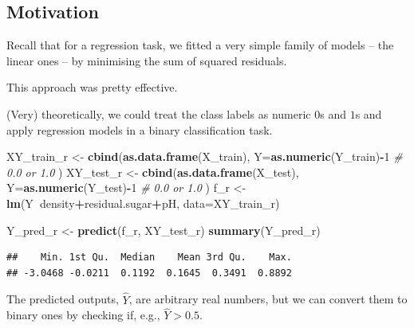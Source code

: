 \documentclass[10pt,b5paper,krantz1]{krantz}
\newenvironment{Shaded}{\begin{snugshade}}{\end{snugshade}}
\newcommand{\CommentTok}[1]{\textcolor[rgb]{0.37,0.37,0.37}{\textit{#1}}}
\newcommand{\DataTypeTok}[1]{\textcolor[rgb]{0.27,0.27,0.27}{#1}}
\newcommand{\DecValTok}[1]{\textcolor[rgb]{0.06,0.06,0.06}{#1}}
\newcommand{\FloatTok}[1]{\textcolor[rgb]{0.06,0.06,0.06}{#1}}
\newcommand{\KeywordTok}[1]{\textcolor[rgb]{0.27,0.27,0.27}{\textbf{#1}}}
\newcommand{\NormalTok}[1]{#1}
\newcommand{\OperatorTok}[1]{\textcolor[rgb]{0.43,0.43,0.43}{\textbf{#1}}}
\newcommand{\StringTok}[1]{\textcolor[rgb]{0.5,0.5,0.5}{#1}}
\begin{document}
\hypertarget{motivation}{%
\subsection{Motivation}\label{motivation}}

Recall that for a regression task, we fitted a very simple family of models
-- the linear ones -- by minimising the sum of squared residuals.

This approach was pretty effective.

(Very) theoretically, we could treat the class labels as numeric \(0\)s and \(1\)s
and apply regression models in a binary classification task.

\begin{Shaded}
\begin{Highlighting}[]
\NormalTok{XY_train_r <-}\StringTok{ }\KeywordTok{cbind}\NormalTok{(}\KeywordTok{as.data.frame}\NormalTok{(X_train),}
    \DataTypeTok{Y=}\KeywordTok{as.numeric}\NormalTok{(Y_train)}\OperatorTok{-}\DecValTok{1} \CommentTok{# 0.0 or 1.0}
\NormalTok{)}
\NormalTok{XY_test_r <-}\StringTok{ }\KeywordTok{cbind}\NormalTok{(}\KeywordTok{as.data.frame}\NormalTok{(X_test),}
    \DataTypeTok{Y=}\KeywordTok{as.numeric}\NormalTok{(Y_test)}\OperatorTok{-}\DecValTok{1} \CommentTok{# 0.0 or 1.0}
\NormalTok{)}
\NormalTok{f_r <-}\StringTok{ }\KeywordTok{lm}\NormalTok{(Y}\OperatorTok{~}\NormalTok{density}\OperatorTok{+}\NormalTok{residual.sugar}\OperatorTok{+}\NormalTok{pH, }\DataTypeTok{data=}\NormalTok{XY_train_r)}
\end{Highlighting}
\end{Shaded}

\begin{Shaded}
\begin{Highlighting}[]
\NormalTok{Y_pred_r <-}\StringTok{ }\KeywordTok{predict}\NormalTok{(f_r, XY_test_r)}
\KeywordTok{summary}\NormalTok{(Y_pred_r)}
\end{Highlighting}
\end{Shaded}

\begin{verbatim}
##    Min. 1st Qu.  Median    Mean 3rd Qu.    Max. 
## -3.0468 -0.0211  0.1192  0.1645  0.3491  0.8892
\end{verbatim}

The predicted outputs, \(\hat{Y}\), are arbitrary real numbers,
but we can convert them to binary ones by checking if, e.g., \(\hat{Y}>0.5\).

\begin{Shaded}
\end{Shaded}
\end{document}
